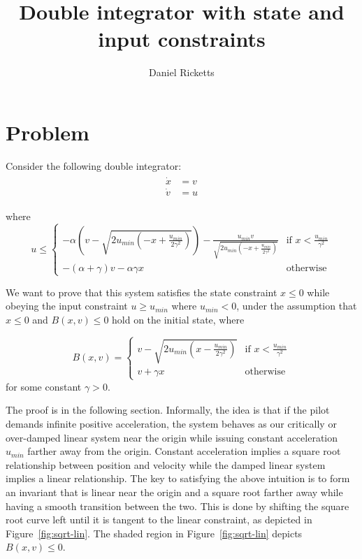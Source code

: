 \documentclass[12pt]{article}
\title{Double integrator with state and input constraints}
\author{Daniel Ricketts}
\newcommand{\umin}{u_{min}}
\newcommand{\p}{\gamma}
\newcommand{\q}{\alpha}
\begin{document}
\maketitle

\section{Problem}
Consider the following double integrator:
\begin{align}
\begin{split}
\dot{x} &= v \\
\dot{v} &= u
\end{split}
\label{sys1}
\end{align}

where
\[
u \leq
\begin{cases}
-\q(v - \sqrt{2\umin(-x + \frac{\umin}{2\p^2})}) - \frac{\umin v}{\sqrt{2\umin(-x + \frac{\umin}{2\p^2})}} & \text{if } x < \frac{\umin}{\p^2}\\
-(\q + \p) v -\q\p x & \text{otherwise}
\end{cases}
\]

We want to prove that this system satisfies the state constraint $x \leq 0$
while obeying the input constraint $u \geq \umin$ where $\umin < 0$, under
the assumption that $x \leq 0$ and $B(x,v) \leq 0$ hold on the initial
state, where

\[B(x,v) =
\begin{cases}
v - \sqrt{2\umin(x - \frac{\umin}{2\p^2})} & \text{if } x < \frac{\umin}{\p^2}\\
v + \p x & \text{otherwise}
\end{cases}
\]
for some constant $\p > 0$.

The proof is in the following section. Informally, the idea is that if the
pilot demands infinite positive acceleration, the system behaves as our
critically or over-damped linear system near the origin while issuing
constant acceleration $\umin$ farther away from the origin. Constant
acceleration implies a square root relationship between position and
velocity while the damped linear system implies a linear relationship. The
key to satisfying the above intuition is to form an invariant that is
linear near the origin and a square root farther away while having a smooth
transition between the two. This is done by shifting the square root curve
left until it is tangent to the linear constraint, as depicted in
Figure~\ref{fig:sqrt-lin}. The shaded region in Figure~\ref{fig:sqrt-lin}
depicts $B(x,v) \leq 0$.
\end{document}
